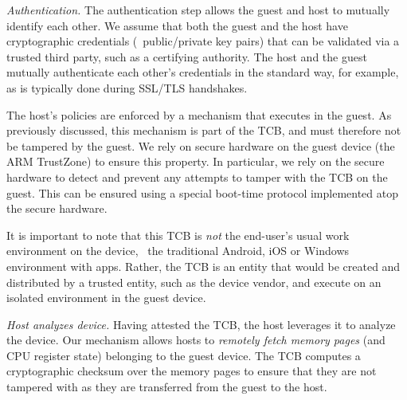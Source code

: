 \begin{mylist}
%
\item \textit{Authentication.} The authentication step allows the guest and
host to mutually identify each other. We assume that both the guest and the
host have cryptographic credentials (\eg~public/private key pairs) that can be
validated via a trusted third party, such as a certifying authority. The host
and the guest mutually authenticate each other's credentials in the standard
way, for example, as is typically done during SSL/TLS handshakes.

The host's policies are enforced by a mechanism that executes in the guest.  As
previously discussed, this mechanism is part of the TCB, and must therefore not
be tampered by the guest.  We rely on secure hardware on the guest device (the
ARM TrustZone) to ensure this property.  In particular, we rely on the secure
hardware to detect and prevent any attempts to tamper with the TCB on the
guest. This can be ensured using a special boot-time protocol implemented atop
the secure hardware.

It is important to note that this TCB is \textit{not} the end-user's usual work
environment on the device, \eg~the traditional Android, iOS or Windows
environment with apps. Rather, the TCB is an entity that would be created and
distributed by a trusted entity, such as the device vendor, and execute on an
isolated environment in the guest device. 

%
%

\item \textit{Host analyzes device.} Having attested the TCB, the host
leverages it to analyze the device. Our mechanism allows hosts to
\textit{remotely fetch memory pages} (and CPU register state) belonging to the
guest device.  The TCB computes a cryptographic checksum over the memory pages
to ensure that they are not tampered with as they are transferred from the
guest to the host. 


\end{mylist}

